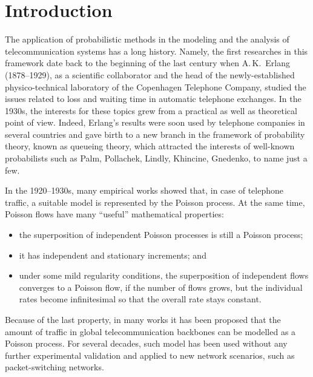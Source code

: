 

      \thispagestyle{headings}

      \begin{multicols}{2}

            \label{st\stat}

\section{Introduction}

\noindent
The application of probabilistic methods in the modeling and the analysis of telecommunication 
systems has a long history.
Namely, the first researches in this framework date back to the beginning of the last 
century when A.\,K.~Erlang (1878--1929), as a scientific collaborator and the head of 
the newly-established physico-technical laboratory of the Copenhagen Telephone 
Company, studied the issues related to loss and waiting time in automatic telephone 
exchanges.
In the 1930s, the interests for these topics grew from a practical 
as well as theoretical point of view. Indeed, Erlang's results were soon used by 
telephone companies in several countries and gave birth to a new branch  in the framework 
of probability theory, known as queueing theory, which attracted the interests of 
well-known probabilists such as Palm, Pollachek, Lindly, Khincine, Gnedenko, to name 
just a few.     

In the 1920--1930s, many empirical works showed that, in case of 
telephone traffic, a suitable model is represented by the Poisson process. 
At the same time, Poisson flows have many ``useful'' mathematical properties:
\begin{itemize}
\item the superposition of independent Poisson processes is still a Poisson process;    
\item it has independent and stationary increments; and
\item under some mild regularity conditions, the superposition of independent flows 
converges to a Poisson flow, if the number of flows grows, but the individual rates 
become infinitesimal so that the overall rate stays constant. 
\end{itemize}

Because of the last property, in many works it has been proposed that the amount of 
traffic in global telecommunication backbones can be modelled as a Poisson process. 
For several decades, such model has been used without any further experimental 
validation and applied to new network scenarios, such as packet-switching networks.


\end{multicols}
